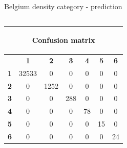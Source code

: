 \documentclass[c]{beamer}
\begin{document}
\begin{frame}
\begin{columns}
\begin{column}{0.5\textwidth}
\begin{overlayarea}{\linewidth}{4cm}
  \end{overlayarea}
  \begin{overlayarea}{\linewidth}{0.5cm}
    \centering
    \tiny Belgium density category - prediction\par
  \end{overlayarea}
 \end{column}
\end{columns}
\begin{columns}
 \begin{column}{0.5\textwidth}
 \begin{overlayarea}{\linewidth}{2cm}
  \begin{table}
  \begin{center}
  \begin{adjustbox}{max width=0.7\textwidth}
  {\tiny
  \begin{tabular}{|c|c|c|c|c|c|c|}
    \hline
    \multicolumn{7}{|c|}{{\tiny \begin{bf}Confusion matrix\end{bf}}} \\
    \hline
     & \textbf{1} & \textbf{2} & \textbf{3} & \textbf{4} & \textbf{5} & \textbf{6}\\
    \hline
    \textbf{1} & 32533 & 0 & 0 & 0 & 0 & 0\\
    \hline
    \textbf{2} & 0 & 1252 & 0 & 0 & 0 & 0\\
    \hline
    \textbf{3} & 0 & 0 & 288 & 0 & 0 & 0\\
    \hline
    \textbf{4} & 0 & 0 & 0 & 78 & 0 & 0\\
    \hline
    \textbf{5} & 0 & 0 & 0 & 0 & 15 & 0\\
    \hline
    \textbf{6} & 0 & 0 & 0 & 0 & 0 & 24\\
    \hline
  \end{tabular}
  }
  \end{adjustbox}
  \end{center}
  \end{table}
 \end{overlayarea}
 \end{column}
 \begin{column}{0.5\textwidth}
 \begin{overlayarea}{\linewidth}{2cm}
  \begin{table}
    \begin{center}
    \begin{adjustbox}{max width=0.4\textwidth}
    {\tiny 
    \begin{tabular}{|c|c|}
      \hline

\end{tabular}}
\end{adjustbox}
\end{center}
\end{table}
\end{overlayarea}
\end{column}
\end{columns}
\end{frame}
\end{document}

